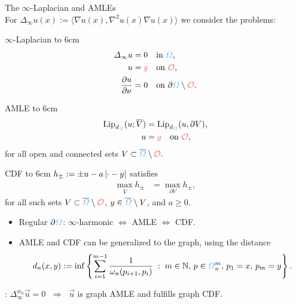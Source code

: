 \begin{minipage}[b][\midHeight][t]{.48\textwidth}%
{\color{BaseDarkColor} The $\infty$-Laplacian and AMLEs}\\%
%
For $\Delta_\infty u(x) := \langle \nabla u(x), \nabla^2 u(x) \nabla u(x)\rangle$ we consider the problems:\vspace{-1em}\\
%
%
\begin{minipage}[t]{.3\textwidth}%
\begin{block}{$\infty$-Laplacian}
\vbox to 6cm{%
\small%
\begin{align*}
\Delta_\infty u &= 0\quad\text{in }\domain,\\
u&=\color{grape} g\nc\quad\text{on }\constr,\\
\frac{\partial u}{\partial\nu} &= 0 \quad\text{on }\partial\domain\setminus\constr.
\end{align*}
\vfill}%
\end{block}
\end{minipage}%
%
\hfill%
%
\begin{minipage}[t]{.33\textwidth}%
%
\begin{block}{AMLE}
\vbox to 6cm{%
\small%
\begin{align*}
\Lip_{d_\domain}(u; \overline{V}) &= \Lip_{d_\domain}(u, \partial V),\\
u &= \color{grape} g\nc\quad\text{on }\constr,
\end{align*}
for all open and connected sets  $V\subset \overline{\domain}\setminus\constr.$
\vfill%
}%
\end{block}
\end{minipage}%
%
\hfill%
%
\begin{minipage}[t]{.33\textwidth}%
%
\begin{block}{CDF}
\vbox to 6cm{%
\small%
$h_\pm := \pm u - a \left|\cdot - y\right|$ satisfies
\abovedisplayskip=0pt%
\begin{align*}
\max_{\overline V}h_\pm &= 
\max_{\partial V} h_\pm,
\end{align*}
for all such sets $V\subset \overline{\domain}\setminus\constr$, $y\in\overline{\domain}\setminus V$, and $a\geq 0$.
\vfill%
}%
\end{block}
\end{minipage}
%
\begin{itemize}
\setlength\itemsep{3pt}
\item Regular $\partial\domain$: $\infty$-harmonic $\Leftrightarrow$ AMLE $\Leftrightarrow$ CDF. 
\item AMLE and CDF can be generalized to the graph, using the distance
%
\small
\begin{align*}
d_n(x,y) 
:=
\inf
\left\lbrace
\sum_{i=1}^{m-1} \frac{1}{\omega_n(p_{i+1},p_i)}
\st 
m \in \N,\,
p \in \domain_n^m,\,
p_1=x,\,p_m = y
\right\rbrace.
\end{align*}
%
\end{itemize}
%
\begin{block}{}%
\cite{bungert2021uniform}: 
$\Delta_\infty^{w_n}\vec u=0$ $\;\Rightarrow\;$ $\vec u$ is graph AMLE and fulfills graph CDF.
\end{block}%
\end{minipage}%
